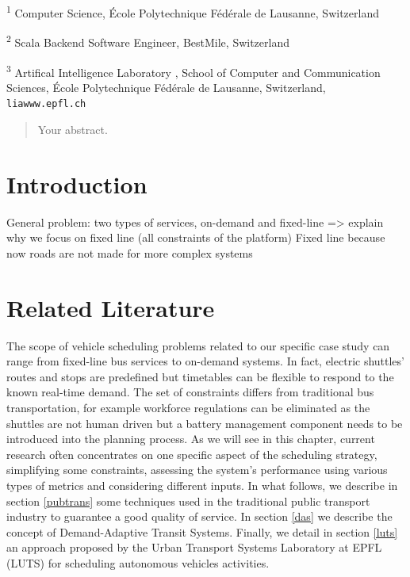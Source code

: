 \documentclass[12pt,a4paper]{article}
\begin{document}
\small \textsuperscript{1} Computer Science,  \'Ecole Polytechnique F\'ed\'erale de Lausanne, Switzerland

\small \textsuperscript{2} Scala Backend Software Engineer, BestMile, Switzerland 

\small \textsuperscript{3} Artifical Intelligence Laboratory , School of Computer and Communication Sciences, \'Ecole Polytechnique F\'ed\'erale de Lausanne, Switzerland, \verb+liawww.epfl.ch+ 




\newpage


\begin{abstract}
Your abstract.
\end{abstract}

\newpage

\tableofcontents
\newpage
\setlength{\parskip}{0.5em}
\section{Introduction}
General problem: two types of services, on-demand and fixed-line => explain why we focus on fixed line (all constraints of the platform) 
Fixed line because now roads are not made for more complex systems


\section{Related Literature}\label{literature} 
The scope of vehicle scheduling problems related to our specific case study can range from fixed-line bus services to on-demand systems. In fact, electric shuttles' routes and stops are predefined but timetables can be flexible to respond to the known real-time demand. The set of constraints differs from traditional bus transportation, for example workforce regulations can be eliminated as the shuttles are not human driven but a battery management component needs to be introduced into the planning process. As we will see in this chapter, current research often concentrates on one specific aspect of the scheduling strategy, simplifying some constraints, assessing the system's performance using various types of metrics and considering different inputs. In what follows, we describe in section \ref{pubtrans} some techniques used in the traditional public transport industry to guarantee a good quality of service. In section \ref{das} we describe the concept of Demand-Adaptive Transit Systems. Finally, we detail in section \ref{luts} an approach proposed by the Urban Transport Systems Laboratory at EPFL (LUTS) for scheduling autonomous vehicles activities.  
\end{document}
